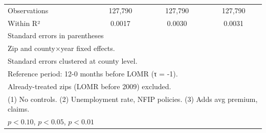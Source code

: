 \begin{table}[htbp]
\begin{tabular}{l*{3}{c}}
\hline
Observations        &     127,790         &     127,790         &     127,790         \\
Within R²           &      0.0017         &      0.0030         &      0.0031         \\
\hline\hline
\multicolumn{4}{l}{\footnotesize Standard errors in parentheses}\\
\multicolumn{4}{l}{\footnotesize Zip and county×year fixed effects.}\\
\multicolumn{4}{l}{\footnotesize Standard errors clustered at county level.}\\
\multicolumn{4}{l}{\footnotesize Reference period: 12-0 months before LOMR (τ = -1).}\\
\multicolumn{4}{l}{\footnotesize Already-treated zips (LOMR before 2009) excluded.}\\
\multicolumn{4}{l}{\footnotesize (1) No controls. (2) Unemployment rate, NFIP policies. (3) Adds avg premium, claims.}\\
\multicolumn{4}{l}{\footnotesize \sym{*} \(p<0.10\), \sym{**} \(p<0.05\), \sym{***} \(p<0.01\)}\\
\end{tabular}
\end{table}
